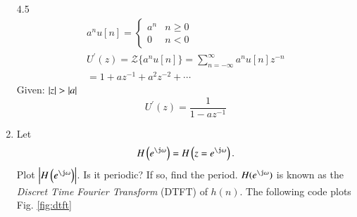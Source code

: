 \documentclass[journal,12pt,twocolumn]{IEEEtran}
\renewcommand\thesection{\arabic{section}}
\begin{document}
\begin{enumerate}[label=\thesection.\arabic*]
		4.5 \solution
		\begin{align}
			a^{n}u[n] = \begin{cases} a^{n} & n \geq 0 \\
				0 & n<0\end{cases} \\
			U^{\prime}(z)={\mathcal{Z}}\{a^{n}u[n]\}=\sum_{n=-\infty}^{\infty} a^{n}u[n] z^{-n}\\
			=1+az^{-1}+a^{2}z^{-2}+\cdots
		\end{align}
Given: $\left\vert z\right\vert > \left\vert a\right\vert$\\
		\begin{equation}
			\label{eq:U'} 
			U^{\prime}(z)=\frac{1}{1-a z^{-1}}
		\end{equation}
		
		
		\item 
		Let
		\begin{equation}
			H\brak{e^{\j \omega}} = H\brak{z = e^{\j \omega}}.
		\end{equation}
		Plot $\abs{H\brak{e^{\j \omega}}}$.  Is it periodic? If so, find the period. $H(e^{\j \omega})$ is
		known as the {\em Discret Time Fourier Transform} (DTFT) of $h(n)$.
		\solution The following code plots Fig. \ref{fig:dtft}
		

\end{enumerate}
\end{document}
